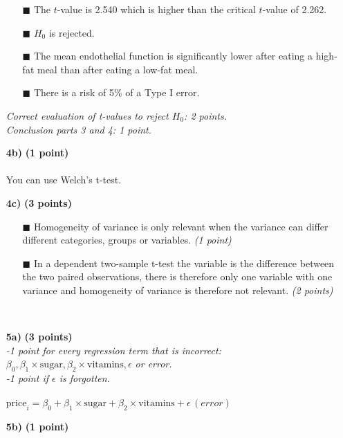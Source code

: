 \begin{itemize}
        \begin{itemize}
        \item[$\blacksquare$] The $t$-value is 2.540 which is higher than the critical $t$-value of 2.262.
        \item[$\blacksquare$] $H_0$ is rejected.
        \item[$\blacksquare$] The mean endothelial function is significantly lower after eating a high-fat meal than after eating a low-fat meal.
\item[$\blacksquare$] There is a risk of 5\% of a Type I error.
        \end{itemize}
        \textit{Correct evaluation of t-values to reject $H_0$: 2 points. \\ Conclusion parts 3 and 4: 1 point.} \\
\item[\textbf{4b)}] \textbf{(1 point)} \\ \\
You can use Welch’s t-test. \\
\item[\textbf{4c)}] \textbf{(3 points)} \\
        \begin{itemize}
        \item[$\blacksquare$] Homogeneity of variance is only relevant when the variance can differ different categories, groups or variables. \textit{(1 point)}
        \item[$\blacksquare$] In a dependent two-sample t-test the variable is the difference between the two paired observations, there is therefore only one variable with one variance and homogeneity of variance is therefore not relevant. \textit{(2 points)}
        \end{itemize} \\
\item[\textbf{5a)}] \textbf{(3 points)} \\
\textit{-1 point for every regression term that is incorrect: \\$\beta_0, \beta_1 \times \text{sugar}, \beta_2 \times \text{vitamins}, \epsilon$ or error. \\-1 point if $\epsilon$ is forgotten.} \\ \\ 
$\text{price}_i = \beta_0 + \beta_1 \times \text{sugar} + \beta_2 \times \text{vitamins} + \epsilon\, (error)$ \\
\item[\textbf{5b)}] \textbf{(1 point)} \\

\end{itemize}
